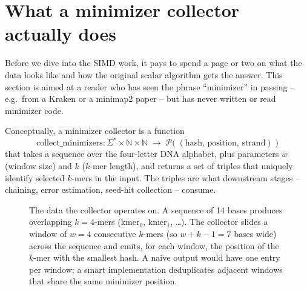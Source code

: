 \section{What a minimizer collector actually does}
\label{sec:what-is-minimizer}

Before we dive into the SIMD work, it pays to spend a page or two on
what the data looks like and how the original scalar algorithm gets
the answer.  This section is aimed at a reader who has seen the
phrase ``minimizer'' in passing -- e.g.\ from a Kraken or a minimap2
paper -- but has never written or read minimizer code.

Conceptually, a minimizer collector is a function
\[
\mathrm{collect\_minimizers}\colon \Sigma^* \times \mathbb{N} \times \mathbb{N}
\;\to\; \mathcal{P}\!\big(\;(\text{hash},\,\text{position},\,\text{strand})\;\big)
\]
that takes a sequence over the four-letter DNA alphabet, plus
parameters $w$ (window size) and $k$ ($k$-mer length), and returns a
set of triples that uniquely identify selected $k$-mers in the input.
The triples are what downstream stages -- chaining, error estimation,
seed-hit collection -- consume.

\begin{figure}[ht]
  \centering
  \caption{The data the collector operates on. A sequence of 14
    bases produces overlapping $k=4$-mers
    (kmer$_0$, kmer$_1$, \ldots). The collector slides a
    window of $w=4$ consecutive $k$-mers (so $w+k-1=7$ bases wide)
    across the sequence and emits, for each window, the position of
    the $k$-mer with the smallest hash. A naive output would have
    one entry per window; a smart implementation deduplicates
    adjacent windows that share the same minimizer position.}
  \label{fig:minimizer-data}
\end{figure}

